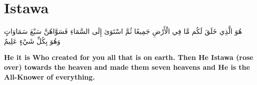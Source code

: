 \chapter{Istawa}
\begin{center}
    {\Huge    
        \begin{Arabic}
            هُوَ الَّذِي خَلَقَ لَكُم مَّا فِي الْأَرْضِ جَمِيعًا ثُمَّ اسْتَوَىٰ إِلَى السَّمَاءِ فَسَوَّاهُنَّ سَبْعَ سَمَاوَاتٍ وَهُوَ بِكُلِّ شَيْءٍ عَلِيمٌ
        \end{Arabic}
    }    
\end{center}
\vspace*{\fill}
\vspace{3cm}
\begin{center}
    \large \textbf{He it is Who created for you all that is on earth. Then He Istawa (rose over) towards the heaven and made them seven heavens and He is the All-Knower of everything.}
\end{center}

